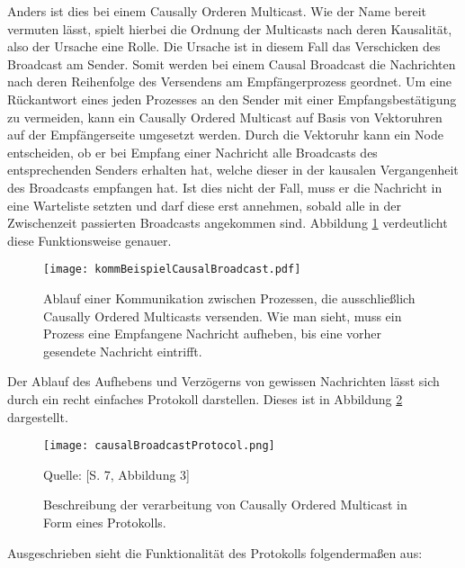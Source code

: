 Anders ist dies bei einem Causally Orderen Multicast. Wie der Name bereit vermuten lässt, spielt hierbei die Ordnung der Multicasts nach deren Kausalität, also der Ursache eine Rolle. Die Ursache ist in diesem Fall das Verschicken des Broadcast am Sender. Somit werden bei einem Causal Broadcast die Nachrichten nach deren Reihenfolge des Versendens am Empfängerprozess geordnet. Um eine Rückantwort eines jeden Prozesses an den Sender mit einer Empfangsbestätigung zu vermeiden, kann ein Causally Ordered Multicast auf Basis von Vektoruhren auf der Empfängerseite umgesetzt werden. Durch die Vektoruhr kann ein Node entscheiden, ob er bei Empfang einer Nachricht alle Broadcasts des entsprechenden Senders erhalten hat, welche dieser in der kausalen Vergangenheit des Broadcasts empfangen hat. Ist dies nicht der Fall, muss er die Nachricht in eine Warteliste setzten und darf diese erst annehmen, sobald alle in der Zwischenzeit passierten Broadcasts angekommen sind. Abbildung \ref{figure:causalbroadcast} verdeutlicht diese Funktionsweise genauer.

\begin{figure}[ht]
	\centering
	\texttt{[image: kommBeispielCausalBroadcast.pdf]}
	\caption[Kommunikation durch Causally Ordered Multicasts]{Ablauf einer Kommunikation zwischen Prozessen, die ausschließlich Causally Ordered Multicasts versenden. Wie man sieht, muss ein Prozess eine Empfangene Nachricht aufheben, bis eine vorher gesendete Nachricht eintrifft.}
	\label{figure:causalbroadcast}
\end{figure}
\FloatBarrier

Der Ablauf des Aufhebens und Verzögerns von gewissen Nachrichten lässt sich durch ein recht einfaches Protokoll darstellen. Dieses ist in Abbildung \ref{figure:causalBroadcastProtocol} dargestellt.

\begin{figure}[ht]
	\centering
	\texttt{[image: causalBroadcastProtocol.png]}
	\caption[Protokoll für den Causally Ordered Multicast]{Beschreibung der verarbeitung von Causally Ordered Multicast in Form eines Protokolls.}
	Quelle: \cite{Baldoni:2002:FDC:1435723.1437765}[S. 7, Abbildung 3]
	\label{figure:causalBroadcastProtocol}
\end{figure}
\FloatBarrier

Ausgeschrieben sieht die Funktionalität des Protokolls folgendermaßen aus:

